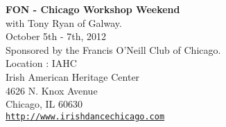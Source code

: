 \vspace{0pt}
{\large\textbf{FON - Chicago Workshop Weekend}}\\ 

with Tony Ryan of Galway.\\October 5th - 7th, 2012\\ Sponsored by the Francis O'Neill Club of Chicago.\\

\vspace*{0.5em}
Location : IAHC\\
Irish American Heritage Center\\
4626 N. Knox Avenue\\
Chicago, IL  60630 \\

\href{http://www.irishdancechicago.com}{\tt http://www.irishdancechicago.com}
